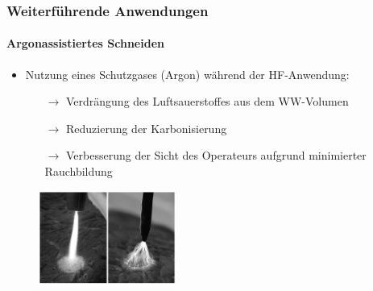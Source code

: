 \documentclass{beamer}
\begin{document}
\begin{frame}
\frametitle{Weiterführende Anwendungen}
\framesubtitle{Argonassistiertes Schneiden}
\begin{itemize}
	\item Nutzung eines Schutzgases (Argon) während der HF-Anwendung:
	\begin{itemize}
		\item [$\rightarrow$]Verdrängung des Luftsauerstoffes aus dem WW-Volumen
		\item [$\rightarrow$]Reduzierung der Karbonisierung
		\item [$\rightarrow$]Verbesserung der Sicht des Operateurs aufgrund minimierter Rauchbildung
	\end{itemize}
	\vspace{0.2cm}
\end{itemize}
\begin{figure}
	\centering
	\includegraphics[width=4.5cm]{images/argon.png}
	\cite{kramme2016medizintechnik}
\end{figure}
\end{frame}
\end{document}
